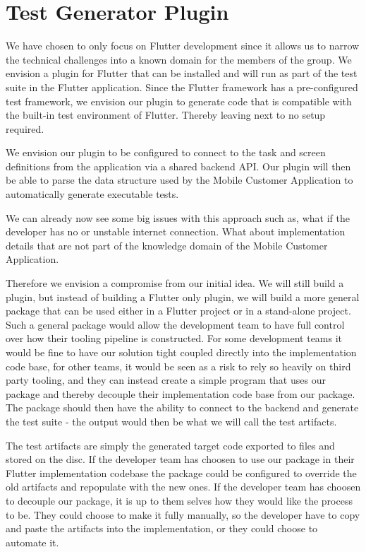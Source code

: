 \section{Test Generator Plugin}
We have chosen to only focus on Flutter development since it allows us to narrow the technical challenges into a known domain for the members of the group.
We envision a plugin for Flutter that can be installed and will run as part of the test suite in the Flutter application.
Since the Flutter framework has a pre-configured test framework, we envision our plugin to generate code that is compatible with the built-in test environment of Flutter.
Thereby leaving next to no setup required.

We envision our plugin to be configured to connect to the task and screen definitions from the application via a shared backend API.
Our plugin will then be able to parse the data structure used by the Mobile Customer Application to automatically generate executable tests.

We can already now see some big issues with this approach such as, what if the developer has no or unstable internet connection.
What about implementation details that are not part of the knowledge domain of the Mobile Customer Application.

Therefore we envision a compromise from our initial idea. 
We will still build a plugin, but instead of building a Flutter only plugin, we will build a more general package that can be used either in a Flutter project or in a stand-alone project.
Such a general package would allow the development team to have full control over how their tooling pipeline is constructed.
For some development teams it would be fine to have our solution tight coupled directly into the implementation code base, for other teams, it would be seen as a risk to rely so heavily on third party tooling, and they can instead create a simple program that uses our package and thereby decouple their implementation code base from our package. 
The package should then have the ability to connect to the backend and generate the test suite - the output would then be what we will call the test artifacts.

The test artifacts are simply the generated target code exported to files and stored on the disc. 
If the developer team has choosen to use our package in their Flutter implementation codebase the package could be configured to override the old artifacts and repopulate with the new ones.
If the developer team has choosen to decouple our package, it is up to them selves how they would like the process to be.
They could choose to make it fully manually, so the developer have to copy and paste the artifacts into the implementation, or they could choose to automate it.

